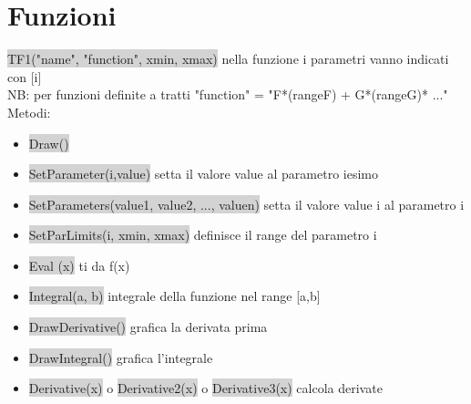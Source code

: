 \documentclass[a4paper]{article}
\begin{document}
\section{Funzioni}
    \colorbox{LightGray}{TF1("name", "function", xmin, xmax)} nella funzione i parametri vanno indicati con [i]\\
    NB: per funzioni definite a tratti "function" = "F*(rangeF) + G*(rangeG)* ..."
    Metodi:
    \begin{itemize}
        \item \colorbox{LightGray}{Draw()}
        \item \colorbox{LightGray}{SetParameter(i,value)} setta il valore value al parametro iesimo
        \item \colorbox{LightGray}{SetParameters(value1, value2, ..., valuen)} setta il valore value i al parametro i
        \item \colorbox{LightGray}{SetParLimits(i, xmin, xmax)} definisce il range del parametro i
        \item \colorbox{LightGray}{Eval (x)} ti da f(x)
        \item \colorbox{LightGray}{Integral(a, b)} integrale della funzione nel range [a,b]
        \item \colorbox{LightGray}{DrawDerivative()} grafica la derivata prima
        \item \colorbox{LightGray}{DrawIntegral()} grafica l’integrale
        \item \colorbox{LightGray}{Derivative(x)} o \colorbox{LightGray}{Derivative2(x)} o \colorbox{LightGray}{Derivative3(x)} calcola derivate
    \end{itemize}
\end{document}
